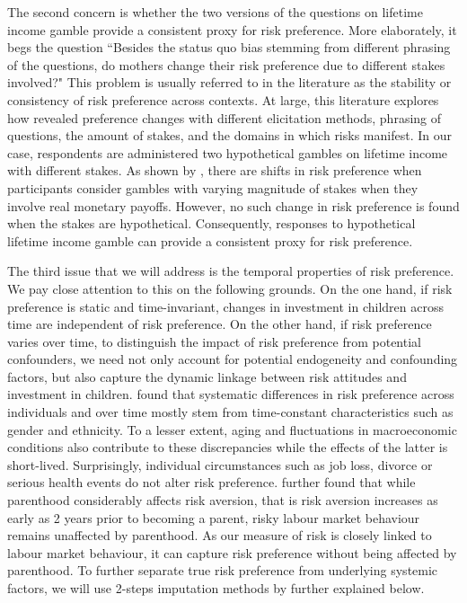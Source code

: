 \documentclass[]{article}
\begin{document}
The second concern is whether the two versions of the questions on lifetime income gamble provide a consistent proxy for risk preference. More elaborately, it begs the question ``Besides the status quo bias stemming from different phrasing of the questions, do mothers change their risk preference due to different stakes involved?" This problem is usually referred to in the literature as the stability or consistency of risk preference across contexts. At large, this literature explores how revealed preference changes with different elicitation methods, phrasing of questions, the amount of stakes, and the domains in which risks manifest. In our case, respondents are administered two hypothetical gambles on lifetime income with different stakes. As shown by \citet{holt2002risk}, there are shifts in risk preference when participants consider gambles with varying magnitude of stakes when they involve real monetary payoffs. However, no such change in risk preference is found when the stakes are hypothetical. Consequently, responses to hypothetical lifetime income gamble can provide a consistent proxy for risk preference.


The third issue that we will address is the temporal properties of risk preference. We pay close attention to this on the following grounds. On the one hand, if risk preference is static and time-invariant, changes in investment in children across time are independent of risk preference. On the other hand, if risk preference varies over time, to distinguish the impact of risk preference from potential confounders, we need not only account for potential endogeneity and confounding factors, but also capture the dynamic linkage between risk attitudes and investment in children. \citet{sahm2012much} found that systematic differences in risk preference across individuals and over time mostly stem from time-constant characteristics such as gender and ethnicity. To a lesser extent, aging and fluctuations in macroeconomic conditions also contribute to these discrepancies while the effects of the latter is short-lived. Surprisingly, individual circumstances such as job loss, divorce or serious health events do not alter risk preference. \citet{gorlitz2020parenthood} further found that while parenthood considerably affects risk aversion, that is risk aversion increases as early as 2 years prior to becoming a parent, risky labour market behaviour remains unaffected by parenthood. As our measure of risk is closely linked to labour market behaviour, it can capture risk preference without being affected by parenthood. To further separate true risk preference from underlying systemic factors, we will use 2-steps imputation methods by \citet{kimball2008imputing,kimball2009risk} further explained below.   
\end{document}
